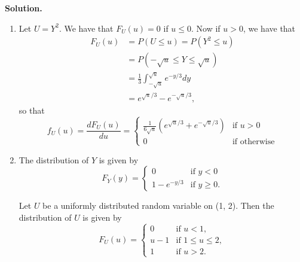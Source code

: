 \documentclass[9pt]{article}
\newcommand{\D}{\displaystyle}
\begin{document}
\begin{enumerate}
      \textbf{Solution.}
      
      \begin{enumerate}
         \item Let $U = Y^2$. We have that $F_U(u) = 0$ if $u \le 0$. Now if
               $u > 0$, we have that 
               \begin{align*}
                  F_U(u) &= P(U \le u) = P(Y^2 \le u) \\
                         &= P(-\sqrt{u} \le Y \le \sqrt{u}) \\
                         &= \frac{1}{3}\int_{-\sqrt{u}}^{\sqrt{u}}e^{-y/3} dy \\
                         &= e^{\sqrt{u}/3} - e^{-\sqrt{u}/3},                     
               \end{align*}
               so that
               \begin{equation*}
                  f_U(u) = \frac{dF_U(u)}{du} = \begin{cases}
                     \D\frac{1}{6\sqrt{u}}\left(e^{\sqrt{u}/3}+
                     e^{-\sqrt{u}/3}\right) & \text{if } u > 0 \\
                     0 & \text{if } \text{otherwise}
                  \end{cases}
               \end{equation*}
         \item The distribution of $Y$ is given by
               \begin{equation*}
                  F_Y(y) = \begin{cases}
                     0 & \text{if } y < 0 \\
                     1 - e^{-y/3} & \text{if } y \ge 0.
                  \end{cases}
               \end{equation*}

               Let $U$ be a uniformly distributed random variable on (1, 2).
               Then the distribution of $U$ is given by
               \begin{equation*}
                  F_U(u) = \begin{cases}
                     0 & \text{if } u < 1, \\
                     u - 1 & \text{if } 1 \le u \le 2, \\
                     1 & \text{if } u > 2.
                  \end{cases}
               \end{equation*}


\end{enumerate}
\end{enumerate}
\end{document}
